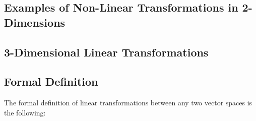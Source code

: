 
\subsection{Examples of Non-Linear Transformations in 2-Dimensions}
%

\subsection{3-Dimensional Linear Transformations}

\subsection{Formal Definition}
The formal definition of linear transformations between any two vector spaces is the following:

